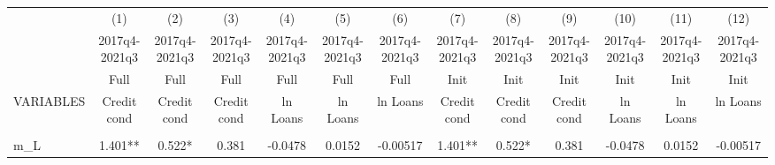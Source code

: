 \documentclass[]{article}
\begin{document}
\begin{center}
\begin{tabular}{lcccccccccccc} \hline
 & (1) & (2) & (3) & (4) & (5) & (6) & (7) & (8) & (9) & (10) & (11) & (12) \\
 & 2017q4-2021q3 & 2017q4-2021q3 & 2017q4-2021q3 & 2017q4-2021q3 & 2017q4-2021q3 & 2017q4-2021q3 & 2017q4-2021q3 & 2017q4-2021q3 & 2017q4-2021q3 & 2017q4-2021q3 & 2017q4-2021q3 & 2017q4-2021q3 \\
 & Full & Full & Full & Full & Full & Full & Init & Init & Init & Init & Init & Init \\
VARIABLES & Credit cond & Credit cond & Credit cond & ln Loans & ln Loans & ln Loans & Credit cond & Credit cond & Credit cond & ln Loans & ln Loans & ln Loans \\ \hline
\vspace{4pt} & \begin{footnotesize}\end{footnotesize} & \begin{footnotesize}\end{footnotesize} & \begin{footnotesize}\end{footnotesize} & \begin{footnotesize}\end{footnotesize} & \begin{footnotesize}\end{footnotesize} & \begin{footnotesize}\end{footnotesize} & \begin{footnotesize}\end{footnotesize} & \begin{footnotesize}\end{footnotesize} & \begin{footnotesize}\end{footnotesize} & \begin{footnotesize}\end{footnotesize} & \begin{footnotesize}\end{footnotesize} & \begin{footnotesize}\end{footnotesize} \\
m\_L & 1.401** & 0.522* & 0.381 & -0.0478 & 0.0152 & -0.00517 & 1.401** & 0.522* & 0.381 & -0.0478 & 0.0152 & -0.00517 \\

\end{tabular}
\end{center}
\end{document}
